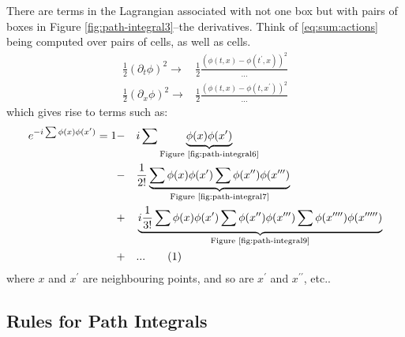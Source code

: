 \documentclass[]{article}
\newcommand\numberthis{\addtocounter{equation}{1}\tag{\theequation}}
\begin{document}
There are terms in the Lagrangian associated with not one box but with pairs of boxes in Figure \ref{fig:path-integral3}--the derivatives. Think of \eqref{eq:sum:actions} being computed over pairs of cells, as well as cells.
\begin{align*}
	\frac{1}{2}(\partial_t \phi)^2 \rightarrow& \frac{1}{2}\frac{(\phi(t,x)-\phi(t^\prime,x))^2}{...}\\
	\frac{1}{2}(\partial_x \phi)^2 \rightarrow& \frac{1}{2}\frac{(\phi(t,x)-\phi(t,x^\prime))^2}{...} 
\end{align*}
which gives rise to terms such as:
\begin{alignat*}{2}
	e^{- i \sum \phi(x) \phi(x^\prime)}=1& -&& i \sum \underbrace{\phi(x) \phi(x^\prime)}_\text{Figure \ref{fig:path-integral6}}\\
	&-&& \frac{1}{2!}\underbrace{\sum \phi(x) \phi(x^\prime)\sum \phi(x^{\prime\prime}) \phi(x^{\prime\prime\prime})}_\text{Figure \ref{fig:path-integral7}}\\
	&+&&\underbrace{i\frac{1}{3!}\sum\phi(x)\phi(x^\prime)\sum\phi(x^{\prime\prime}) \phi(x^{\prime\prime\prime})\sum\phi(x^{\prime\prime\prime\prime}) \phi(x^{\prime\prime\prime\prime\prime})}_\text{Figure \ref{fig:path-integral9}}\\
	&+&& ... \numberthis \label{eq:path:integral:expanded}
\end{alignat*}
where $x$ and $x^{\prime}$ are neighbouring points, and so are $x^{\prime}$ and $x^{\prime\prime}$, etc..

\subsection{Rules for Path Integrals}
\end{document}
